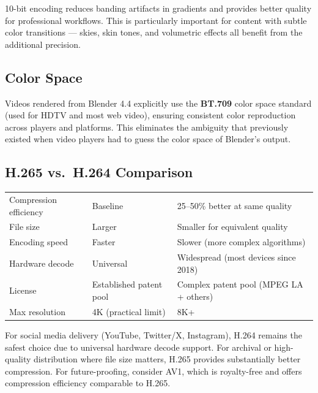 10-bit encoding reduces banding artifacts in gradients and provides better quality for professional workflows. This is particularly important for content with subtle color transitions --- skies, skin tones, and volumetric effects all benefit from the additional precision.

\subsection{Color Space}

Videos rendered from Blender 4.4 explicitly use the \textbf{BT.709} color space standard (used for HDTV and most web video), ensuring consistent color reproduction across players and platforms. This eliminates the ambiguity that previously existed when video players had to guess the color space of Blender's output.

\subsection{H.265 vs.\ H.264 Comparison}

\vspace{0.5em}
\begin{tabularx}{\textwidth}{l L{4.5cm} L{4.5cm}}
\toprule
{}
 &  &  \\
\midrule
Compression efficiency & Baseline & 25--50\% better at same quality \\
File size & Larger & Smaller for equivalent quality \\
Encoding speed & Faster & Slower (more complex algorithms) \\
Hardware decode & Universal & Widespread (most devices since 2018) \\
License & Established patent pool & Complex patent pool (MPEG LA + others) \\
Max resolution & 4K (practical limit) & 8K+ \\
\bottomrule
\end{tabularx}
\vspace{0.5em}

\begin{tipbox}
For social media delivery (YouTube, Twitter/X, Instagram), H.264 remains the safest choice due to universal hardware decode support. For archival or high-quality distribution where file size matters, H.265 provides substantially better compression. For future-proofing, consider AV1, which is royalty-free and offers compression efficiency comparable to H.265.
\end{tipbox}


